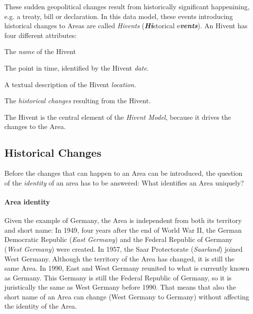 These sudden geopolitical changes result from historically significant happenining, e.g. a treaty, bill or declaration. In this data model, these events introducing historical changes to Areas are called \emph{Hivents} (\emph{\textbf{Hi}}storical e\emph{\textbf{vents}}). An Hivent has four different attributes:

\begin{compactenum}
  \item The \emph{name} of the Hivent
  \item The point in time, identified by the Hivent \emph{date}.
  \item A textual description of the Hivent \emph{location}.
  \item The \emph{historical changes} resulting from the Hivent.
\end{compactenum}

The Hivent is the central element of the \emph{Hivent Model}, because it drives the changes to the Area.


\subsection{Historical Changes} %
\label{sub:historical_changes}

Before the changes that can happen to an Area can be introduced, the question of the \emph{identity} of an area has to be answered: What identifies an Area uniquely?

\paragraph{Area identity} %
\label{par:area_identity}

Given the example of Germany, the Area is independent from both its territory and short name: In 1949, four years after the end of World War II, the German Democratic Republic (\emph{East Germany}) and the Federal Republic of Germany (\emph{West Germany}) were created. In 1957, the Saar Protectorate (\emph{Saarland}) joined West Germany. Although the territory of the Area has changed, it is still the same Area. In 1990, East and West Germany reunited to what is currently known as Germany. This Germany is still the Federal Republic of Germany, so it is juristically the same as West Germany before 1990. That means that also the short name of an Area can change (West Germany to Germany) without affecting the identity of the Area.


